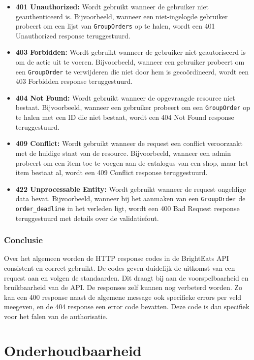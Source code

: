 \begin{itemize}
  \item \textbf{401 Unauthorized:} Wordt gebruikt wanneer de gebruiker niet geauthenticeerd is. Bijvoorbeeld, wanneer een niet-ingelogde gebruiker probeert om een lijst van \texttt{GroupOrders} op te halen, wordt een 401 Unauthorized response teruggestuurd.
  \item \textbf{403 Forbidden:} Wordt gebruikt wanneer de gebruiker niet geautoriseerd is om de actie uit te voeren. Bijvoorbeeld, wanneer een gebruiker probeert om een \texttt{GroupOrder} te verwijderen die niet door hem is gecoördineerd, wordt een 403 Forbidden response teruggestuurd.
  \item \textbf{404 Not Found:} Wordt gebruikt wanneer de opgevraagde resource niet bestaat. Bijvoorbeeld, wanneer een gebruiker probeert om een \texttt{GroupOrder} op te halen met een ID die niet bestaat, wordt een 404 Not Found response teruggestuurd.
  \item \textbf{409 Conflict:} Wordt gebruikt wanneer de request een conflict veroorzaakt met de huidige staat van de resource. Bijvoorbeeld, wanneer een admin probeert om een item toe te voegen aan de catalogus van een shop, maar het item bestaat al, wordt een 409 Conflict response teruggestuurd.
  \item \textbf{422 Unprocessable Entity:} Wordt gebruikt wanneer de request ongeldige data bevat. Bijvoorbeeld, wanneer bij het aanmaken van een \texttt{GroupOrder} de \texttt{order\_deadline} in het verleden ligt, wordt een 400 Bad Request response teruggestuurd met details over de validatiefout.
\end{itemize}

\subsubsection{Conclusie}

Over het algemeen worden de HTTP response codes in de Bright\-Eats API consistent en correct gebruikt. De codes geven duidelijk de uitkomst van een request aan en volgen de standaarden. Dit draagt bij aan de voorspelbaarheid en bruikbaarheid van de API. De responses zelf kunnen nog verbeterd worden. Zo kan een 400 response naast de algemene message ook specifieke errors per veld meegeven, en de 404 response een error code bevatten. Deze code is dan specifiek voor het falen van de authorisatie.

\section{Onderhoudbaarheid}

